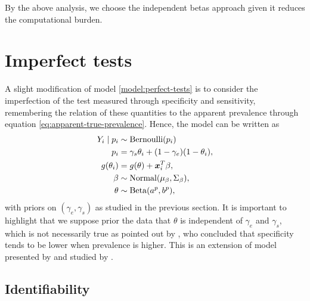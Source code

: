 By the above analysis, we choose the independent betas approach given it 
reduces the computational burden. 

\section{Imperfect tests}

A slight modification of model \eqref{model:perfect-tests} is to consider 
the imperfection of the test measured through specificity and sensitivity, 
remembering the relation of these quantities to the apparent prevalence
through equation \eqref{eq:apparent-true-prevalence}. Hence, the model can be
written as
\begin{equation}
  \label{model:imperfect-tests}
  \begin{aligned}
    Y_i \mid p_i &\sim \operatorname{Bernoulli}(p_i) \\
    p_i &= \gamma_s\theta_i + (1-\gamma_e)(1 - \theta_i),  \\
    g(\theta_i) &= g(\theta) + \boldsymbol{x}_i^T\beta,  \\
    \beta  &\sim \operatorname{Normal}(\mu_{\beta}, \Sigma_{\beta}), \\ 
    \theta &\sim \operatorname{Beta}(a^p, b^p), 
  \end{aligned}  
\end{equation}
with priors on $(\gamma_e, \gamma_s)$ as studied in the previous section. It is
important to highlight that we suppose prior the data that $\theta$ is
independent of $\gamma_e$ and $\gamma_s$, which is not necessarily true as
pointed out by \textcite{leeflang2013variation}, who concluded that
specificity tends to be lower when prevalence is higher. This 
is an extension of model presented by \textcite{gelman2020bayesian} and
studied by \textcite{mcinturff2004modelling}. 

\subsection{Identifiability}

